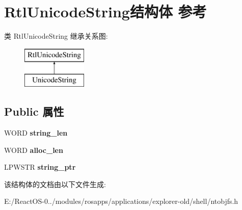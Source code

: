 \hypertarget{struct_rtl_unicode_string}{}\section{Rtl\+Unicode\+String结构体 参考}
\label{struct_rtl_unicode_string}
类 Rtl\+Unicode\+String 继承关系图\+:\begin{figure}[H]
\begin{center}
\leavevmode
\includegraphics[height=2.000000cm]{struct_rtl_unicode_string}
\end{center}
\end{figure}
\subsection*{Public 属性}
\begin{DoxyCompactItemize}
\item 
\mbox{\label{struct_rtl_unicode_string_adc953f29ca7f54b2a63d29dfa72d3410}} 
W\+O\+RD {\bfseries string\+\_\+len}
\item 
\mbox{\label{struct_rtl_unicode_string_ab24f9819a31a1aad203e3d38ffe38dcc}} 
W\+O\+RD {\bfseries alloc\+\_\+len}
\item 
\mbox{\label{struct_rtl_unicode_string_a96d09ea7de1f5b9f103e3f7381a689c0}} 
L\+P\+W\+S\+TR {\bfseries string\+\_\+ptr}
\end{DoxyCompactItemize}


该结构体的文档由以下文件生成\+:\begin{DoxyCompactItemize}
\item 
E\+:/\+React\+O\+S-\/0../modules/rosapps/applications/explorer-\/old/shell/ntobjfs.\+h\end{DoxyCompactItemize}
